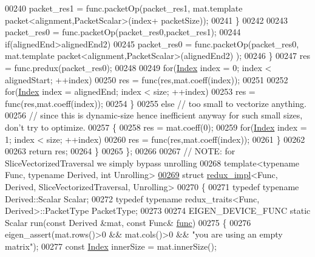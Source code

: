 \begin{DoxyCode}
00240           packet\_res1 = func.packetOp(packet\_res1, mat.template packet<alignment,PacketScalar>(index+
      packetSize));
00241         \}
00242 
00243         packet\_res0 = func.packetOp(packet\_res0,packet\_res1);
00244         \textcolor{keywordflow}{if}(alignedEnd>alignedEnd2)
00245           packet\_res0 = func.packetOp(packet\_res0, mat.template packet<alignment,PacketScalar>(alignedEnd2)
      );
00246       \}
00247       res = func.predux(packet\_res0);
00248 
00249       \textcolor{keywordflow}{for}(\hyperlink{namespace_eigen_a62e77e0933482dafde8fe197d9a2cfde}{Index} index = 0; index < alignedStart; ++index)
00250         res = func(res,mat.coeff(index));
00251 
00252       \textcolor{keywordflow}{for}(\hyperlink{namespace_eigen_a62e77e0933482dafde8fe197d9a2cfde}{Index} index = alignedEnd; index < size; ++index)
00253         res = func(res,mat.coeff(index));
00254     \}
00255     \textcolor{keywordflow}{else} \textcolor{comment}{// too small to vectorize anything.}
00256          \textcolor{comment}{// since this is dynamic-size hence inefficient anyway for such small sizes, don't try to
       optimize.}
00257     \{
00258       res = mat.coeff(0);
00259       \textcolor{keywordflow}{for}(\hyperlink{namespace_eigen_a62e77e0933482dafde8fe197d9a2cfde}{Index} index = 1; index < size; ++index)
00260         res = func(res,mat.coeff(index));
00261     \}
00262 
00263     \textcolor{keywordflow}{return} res;
00264   \}
00265 \};
00266 
00267 \textcolor{comment}{// NOTE: for SliceVectorizedTraversal we simply bypass unrolling}
00268 \textcolor{keyword}{template}<\textcolor{keyword}{typename} Func, \textcolor{keyword}{typename} Derived, \textcolor{keywordtype}{int} Unrolling>
\hyperlink{struct_eigen_1_1internal_1_1redux__impl_3_01_func_00_01_derived_00_01_slice_vectorized_traversal_00_01_unrolling_01_4}{00269} \textcolor{keyword}{struct }\hyperlink{struct_eigen_1_1internal_1_1redux__impl}{redux\_impl}<Func, Derived, SliceVectorizedTraversal, Unrolling>
00270 \{
00271   \textcolor{keyword}{typedef} \textcolor{keyword}{typename} Derived::Scalar Scalar;
00272   \textcolor{keyword}{typedef} \textcolor{keyword}{typename} redux\_traits<Func, Derived>::PacketType PacketType;
00273 
00274   EIGEN\_DEVICE\_FUNC \textcolor{keyword}{static} Scalar run(\textcolor{keyword}{const} Derived &mat, \textcolor{keyword}{const} Func& \hyperlink{structfunc}{func})
00275   \{
00276     eigen\_assert(mat.rows()>0 && mat.cols()>0 && \textcolor{stringliteral}{"you are using an empty matrix"});
00277     \textcolor{keyword}{const} \hyperlink{namespace_eigen_a62e77e0933482dafde8fe197d9a2cfde}{Index} innerSize = mat.innerSize();

\end{DoxyCode}
